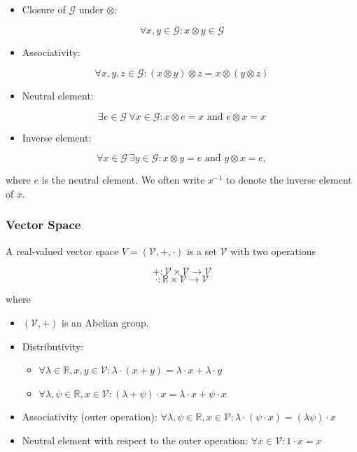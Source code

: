 \documentclass{article}
\begin{document}
\begin{itemize}
\tightlist
\item
  Closure of \(\mathcal{G}\) under \(\otimes\):
\end{itemize}

\[\forall x,y \in \mathcal{G} : x \otimes y \in \mathcal{G}\]

\begin{itemize}
\tightlist
\item
  Associativity:
\end{itemize}

\[\forall x,y,z \in \mathcal{G} : (x \otimes y) \otimes z = x \otimes (y \otimes z)\]

\begin{itemize}
\tightlist
\item
  Neutral element:
\end{itemize}

\[\exists e \in \mathcal{G}\ \forall x \in \mathcal{G} : x \otimes e = x \text{ and } e \otimes x = x\]

\begin{itemize}
\tightlist
\item
  Inverse element:
\end{itemize}

\[\forall x \in \mathcal{G}\ \exists y \in \mathcal{G} : x \otimes y = e \text{ and } y \otimes x = e,\]

where \(e\) is the neutral element. We often write \(x^{-1}\) to denote
the inverse element of \(x\).

\subsubsection{Vector Space}\label{vector-space}

A real-valued vector space \(V = (\mathcal{V}, +, \cdot)\) is a set
\(\mathcal{V}\) with two operations

\[+: \mathcal{V} \times \mathcal{V} \to \mathcal{V}\]
\[\cdot : \mathbb{R} \times \mathcal{V} \to \mathcal{V}\]

where

\begin{itemize}
\item
  \((\mathcal{V}, +)\) is an Abelian group.
\item
  Distributivity:

  \begin{itemize}
  \item
    \(\forall \lambda \in \mathbb{R}, x,y \in \mathcal{V} : \lambda \cdot (x+y) =
    \lambda \cdot x + \lambda \cdot y\)
  \item
    \(\forall \lambda,\psi \in \mathbb{R}, x \in \mathcal{V} : (\lambda+\psi)
    \cdot x = \lambda \cdot x + \psi \cdot x\)
  \end{itemize}
\item
  Associativity (outer operation):
  \(\forall \lambda,\psi \in \mathbb{R}, x \in
  \mathcal{V} : \lambda \cdot (\psi \cdot x) = (\lambda\psi) \cdot x\)
\item
  Neutral element with respect to the outer operation: \(\forall x \in
  \mathcal{V} : 1 \cdot x = x\)
\end{itemize}
\end{document}
